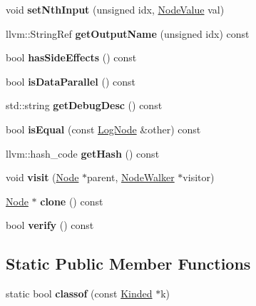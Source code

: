 \begin{DoxyCompactItemize}
void {\bfseries set\+Nth\+Input} (unsigned idx, \hyperlink{structglow_1_1_node_value}{Node\+Value} val)
\item 
\mbox{\label{classglow_1_1_log_node_a7e0d4a7c956e35c1cb40d464ae0d6378}} 
llvm\+::\+String\+Ref {\bfseries get\+Output\+Name} (unsigned idx) const
\item 
\mbox{\label{classglow_1_1_log_node_aa01e382d4474b87b2d096b33b444430f}} 
bool {\bfseries has\+Side\+Effects} () const
\item 
\mbox{\label{classglow_1_1_log_node_a0e8b634d2429d848203417a14ad2f000}} 
bool {\bfseries is\+Data\+Parallel} () const
\item 
\mbox{\label{classglow_1_1_log_node_a46893efbecfaabcc86e0afe366a4978e}} 
std\+::string {\bfseries get\+Debug\+Desc} () const
\item 
\mbox{\label{classglow_1_1_log_node_a3378485f4ad15deefbec9a0c822aba79}} 
bool {\bfseries is\+Equal} (const \hyperlink{classglow_1_1_log_node}{Log\+Node} \&other) const
\item 
\mbox{\label{classglow_1_1_log_node_a0a38320346a5e6da85463fb0ba3153b7}} 
llvm\+::hash\+\_\+code {\bfseries get\+Hash} () const
\item 
\mbox{\label{classglow_1_1_log_node_a8dbaf982bb5a9b0eade969e32aa33f65}} 
void {\bfseries visit} (\hyperlink{classglow_1_1_node}{Node} $\ast$parent, \hyperlink{classglow_1_1_node_walker}{Node\+Walker} $\ast$visitor)
\item 
\mbox{\label{classglow_1_1_log_node_a94626b745ff70a14b30596cd590f873a}} 
\hyperlink{classglow_1_1_node}{Node} $\ast$ {\bfseries clone} () const
\item 
\mbox{\label{classglow_1_1_log_node_a7652ea30da50a8aefaf3f82a657e71c5}} 
bool {\bfseries verify} () const
\end{DoxyCompactItemize}
\subsection*{Static Public Member Functions}
\begin{DoxyCompactItemize}
\item 
\mbox{\label{classglow_1_1_log_node_a6bc860a6e3b5aa1c59e36a708967e6cc}} 
static bool {\bfseries classof} (const \hyperlink{classglow_1_1_kinded}{Kinded} $\ast$k)
\end{DoxyCompactItemize}
